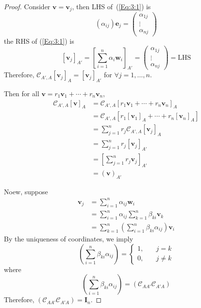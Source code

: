 \begin{proof}
Consider $\bm v=\bm v_j$, then LHS of~(\ref{Eq:3:1}) is
\[
(\alpha_{ij})\bm e_j=\begin{pmatrix}
\alpha_{1j}\\\vdots\\\alpha_{nj}
\end{pmatrix}
\]
the RHS of (\ref{Eq:3:1}) is 
\[
[\bm v_j]_{A'}=[\sum_{i=1}^n\alpha_i\bm w_i]_{A'}
=
\begin{pmatrix}
\alpha_{1j}\\\vdots\\\alpha_{nj}
\end{pmatrix}
=\text{LHS}
\]
Therefore, $\mathcal{C}_{A',A}[\bm v_j]_A=[\bm v_j]_{A'}$ for $\forall j=1,\dots,n$.

Then for all $\bm v=r_1\bm v_1+\cdots+r_n\bm v_n$,
\begin{align*}
\mathcal{C}_{A',A}[\bm v]_{A}&=\mathcal{C}_{A',A}[r_1\bm v_1+\cdots+r_n\bm v_n]_{A}\\
&=\mathcal{C}_{A',A}
\left[
r_1[\bm v_1]_A+\cdots+r_n[\bm v_n]_A
\right]\\
&=\sum_{j=1}^nr_j\mathcal{C}_{A',A}[\bm v_j]_A\\
&=\sum_{j=1}^nr_j[\bm v_j]_{A'}\\
&=\left[\sum_{j=1}^nr_j\bm v_j\right]_{A'}\\
&=(\bm v)_{A'}
\end{align*}

Noew, suppose 
\begin{align*}
\bm v_j&=\sum_{i=1}^n\alpha_{ij}\bm w_i\\
&=\sum_{i=1}^n\alpha_{ij}\sum_{k=1}^n\beta_{ki}\bm v_k\\
&=\sum_{k=1}^n\left(
\sum_{i=1}^n\beta_{ki}\alpha_{ij}
\right)\bm v_i
\end{align*}
By the uniqueness of coordinates, we imply
\[
\left(
\sum_{i=1}^n\beta_{ki}\alpha_{ij}
\right)
=
\left\{
\begin{aligned}
1,&\quad j=k\\
0,&\quad j\ne k
\end{aligned}
\right.
\]
where
\[
\left(
\sum_{i=1}^n\beta_{ki}\alpha_{ij}
\right)
=\left(
\mathcal{C}_{AA'}\mathcal{C}_{A'A}
\right)
\]
Therefore, $\left(
\mathcal{C}_{AA'}\mathcal{C}_{A'A}
\right)=\bm I_n$.
\end{proof}
